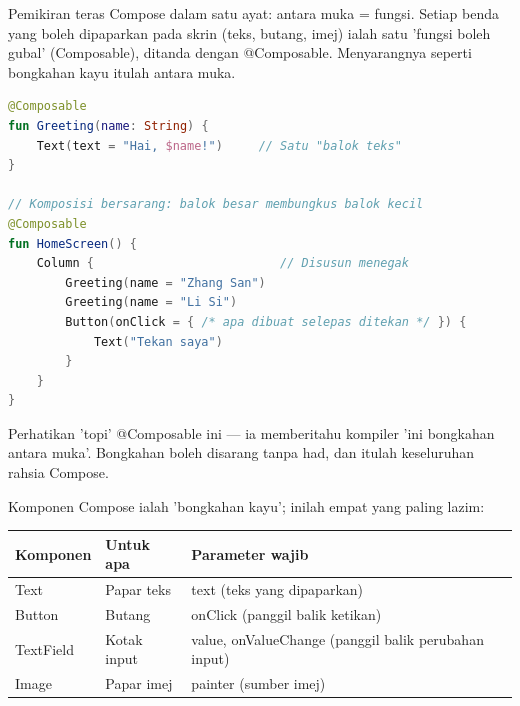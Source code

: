


Pemikiran teras Compose dalam satu ayat: antara muka = fungsi. Setiap benda yang boleh dipaparkan pada skrin (teks, butang, imej) ialah satu 'fungsi boleh gubal' (Composable), ditanda dengan @Composable. Menyarangnya seperti bongkahan kayu itulah antara muka.

\begin{lstlisting}[language=Kotlin]
@Composable
fun Greeting(name: String) {
    Text(text = "Hai, $name!")     // Satu "balok teks"
}

// Komposisi bersarang: balok besar membungkus balok kecil
@Composable
fun HomeScreen() {
    Column {                          // Disusun menegak
        Greeting(name = "Zhang San")
        Greeting(name = "Li Si")
        Button(onClick = { /* apa dibuat selepas ditekan */ }) {
            Text("Tekan saya")
        }
    }
}
\end{lstlisting}

Perhatikan 'topi' @Composable ini — ia memberitahu kompiler 'ini bongkahan antara muka'. Bongkahan boleh disarang tanpa had, dan itulah keseluruhan rahsia Compose.


Komponen Compose ialah 'bongkahan kayu'; inilah empat yang paling lazim:

\begin{center}
\begin{tabularx}{\linewidth}{|X|X|X|}
\hline
\textbf{Komponen} & \textbf{Untuk apa} & \textbf{Parameter wajib} \tabularnewline
\hline
Text & Papar teks & text (teks yang dipaparkan) \tabularnewline
Button & Butang & onClick (panggil balik ketikan) \tabularnewline
TextField & Kotak input & value, onValueChange (panggil balik perubahan input) \tabularnewline
Image & Papar imej & painter (sumber imej) \tabularnewline
\hline
\end{tabularx}
\end{center}

